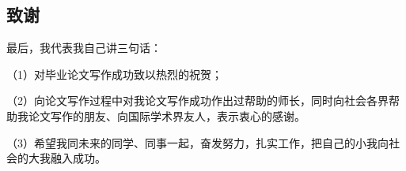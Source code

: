 \begin{ujnthanks}
\section[致谢]{致\qquad 谢}
最后，我代表我自己讲三句话：

（1）对毕业论文写作成功致以热烈的祝贺；

（2）向论文写作过程中对我论文写作成功作出过帮助的师长，同时向社会各界帮助我论文写作的朋友、向国际学术界友人，表示衷心的感谢。

（3）希望我同未来的同学、同事一起，奋发努力，扎实工作，把自己的小我向社会的大我融入成功。
\end{ujnthanks}

